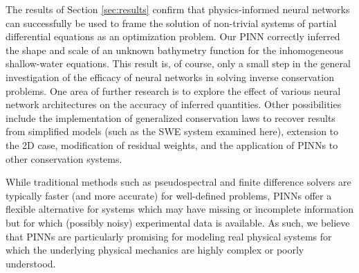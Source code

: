 The results of Section \ref{sec:results} confirm that physics-informed neural networks can successfully be used to frame
the solution of non-trivial systems of partial differential equations as an optimization problem. Our PINN correctly 
inferred the shape and scale of an unknown bathymetry function for the inhomogeneous shallow-water equations. This 
result is, of course, only a small step in the general investigation of the efficacy of neural networks in solving 
inverse conservation problems. One area of further research is to explore the effect of various neural network 
architectures on the accuracy of inferred quantities. Other possibilities include the implementation of generalized 
conservation laws to recover results from simplified models (such as the SWE system examined here), extension to the 2D
case, modification of residual weights, and the application of PINNs to other conservation systems.

While traditional methods such as pseudospectral and finite 
difference solvers are typically faster (and more accurate) for well-defined problems, PINNs offer a flexible 
alternative for systems which may have missing or incomplete information but for which (possibly noisy) experimental 
data is available. As such, we believe that PINNs are particularly promising for modeling real physical systems for 
which the underlying physical mechanics are highly complex or poorly understood. 

